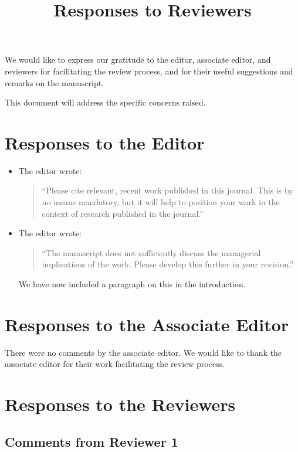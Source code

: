 \documentclass{article}
\title{Responses to Reviewers}
\author{}
\date{}
\begin{document}
\maketitle

We would like to express our gratitude to the editor, associate editor, and reviewers for facilitating the review process, and for their useful suggestions and remarks on the manuscript.

This document will address the specific concerns raised.

\section{Responses to the Editor}

\begin{itemize}

\item The editor wrote:
\begin{quote}
``Please cite relevant, recent work published in this journal. This is by no means mandatory, but it will help to position your work in the context of research published in the journal.''
\end{quote}


\item The editor wrote:
\begin{quote}
``The manuscript does not sufficiently discuss the managerial implications of the work. Please develop this further in your revision.''
\end{quote}
We have now included a paragraph on this in the introduction.

\end{itemize}


\section{Responses to the Associate Editor}
There were no comments by the associate editor. We would like to thank the associate editor for their work facilitating the review process.

\section{Responses to the Reviewers}

\subsection{Comments from Reviewer 1}
\end{document}
